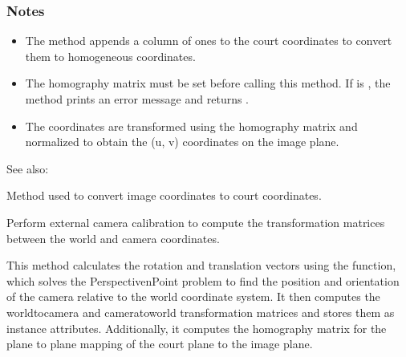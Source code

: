 \documentclass[letterpaper,10pt,english]{sphinxmanual}
\begin{document}
\begin{fulllineitems}
\begin{fulllineitems}
\subsubsection*{Notes}
\begin{itemize}
\item {} 
\sphinxAtStartPar
The method appends a column of ones to the court coordinates to convert them to homogeneous coordinates.

\item {} 
\sphinxAtStartPar
The homography matrix  must be set before calling this method. If  is , the method prints an error message and returns .

\item {} 
\sphinxAtStartPar
The coordinates are transformed using the homography matrix and normalized to obtain the (u, v) coordinates on the image plane.

\end{itemize}


\begin{sphinxseealso}{See also:}
\begin{description}
\sphinxAtStartPar
Method used to convert image coordinates to court coordinates.

\end{description}


\end{sphinxseealso}


\end{fulllineitems}


\begin{fulllineitems}
\label{\detokenize{CameraUtils:id7}}
\pysigstartsignatures
{}
\pysigstopsignatures
\sphinxAtStartPar
Perform external camera calibration to compute the transformation matrices between the world and camera coordinates.

\sphinxAtStartPar
This method calculates the rotation and translation vectors using the  function, which solves the Perspective\sphinxhyphen{}n\sphinxhyphen{}Point problem to find the position and orientation of the camera relative to the world coordinate system. It then computes the world\sphinxhyphen{}to\sphinxhyphen{}camera and camera\sphinxhyphen{}to\sphinxhyphen{}world transformation matrices and stores them as instance attributes. Additionally, it computes the homography matrix for the plane to plane mapping of the court plane to the image plane.



\end{fulllineitems}
\end{fulllineitems}
\end{document}
